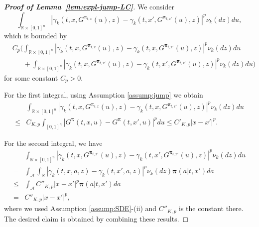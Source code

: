 \documentclass[11pt]{article}
\newcommand{\1}{\mathbbm{1}}
\newcommand{\bpi}{\boldsymbol{\pi}}
\begin{document}
\begin{proof}[\bf Proof of Lemma~\ref{lem:expl-jump-LC}]
We consider
\begin{equation}
	\int_{\mathbb{R}\times[0,1]^n}\left|\gamma_k\left(t,x,G^{\bpi_{t,x}}(u),z\right)-\gamma_k\left(t,x',G^{\bpi_{t,x'}}(u),z\right)\right|^p\nu_k(dz)du,
\end{equation}
which is bounded by
\begin{align}
	&C_p\bigg(\int_{\mathbb{R}\times[0,1]^n}\left|\gamma_k\left(t,x,G^{\bpi_{t,x}}(u),z\right)-\gamma_k\left(t,x,G^{\bpi_{t,x'}}(u),z\right)\right|^p\nu_k(dz)du\\
	&\phantom{C_p~~}+\int_{\mathbb{R}\times[0,1]^n}\left|\gamma_k\left(t,x,G^{\bpi_{t,x'}}(u),z\right)-\gamma_k\left(t,x',G^{\bpi_{t,x'}}(u),z\right)\right|^p\nu_k(dz)du\bigg)
\end{align}
for some constant $C_p>0$.

For the first integral, using Assumption \ref{assump:jump} we obtain
\begin{align}
	&\int_{\mathbb{R}\times[0,1]^n}\left|\gamma_k\left(t,x,G^{\bpi_{t,x}}(u),z\right)-\gamma_k\left(t,x,G^{\bpi_{t,x'}}(u),z\right)\right|^p\nu_k(dz)du \\
	\leq&C_{K,p}\int_{[0,1]^n}\left|G^{\bpi}(t,x,u)-G^{\bpi}(t,x',u)\right|^pdu
	\leq C'_{K,p}|x-x'|^p.
\end{align}

For the second integral, we have
\begin{align}
	&\int_{\mathbb{R}\times[0,1]^n}\left|\gamma_k\left(t,x,G^{\bpi_{t,x'}}(u),z\right)-\gamma_k\left(t,x',G^{\bpi_{t,x'}}(u),z\right)\right|^p\nu_k(dz)du\\
	=&\int_{\mathcal{A}}\int_{\mathbb{R}}\left|\gamma_k\left(t,x,a,z\right)-\gamma_k\left(t,x',a,z\right)\right|^p\nu_k(dz)\bpi(a|t,x')da\\
	\leq&\int_{\mathcal{A}} C''_{K,p}|x-x'|^p\bpi(a|t,x')da\\
	=&C''_{K,p}|x-x'|^p,
\end{align}
where we used Assumption \ref{assump:SDE}-(ii) and $C''_{K,p}$ is the constant there. The desired claim is obtained by combining these results.
\end{proof}
\end{document}
